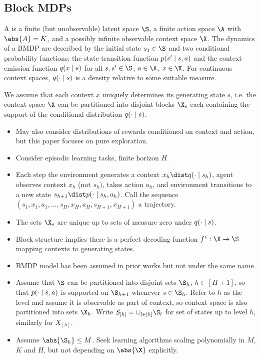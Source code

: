 \documentclass[11pt, openany]{book}
\begin{document}
\subsection{Block MDPs}
\begin{definition}
    A  is a finite (but unobservable) latent space $\S$, a finite action space $\A$ with $\abs{A}=K$, and a possibly infinite observable context space $\X$. The dynamics of a BMDP are described by the initial state $s_1\in\S$ and two conditional probability functions: the state-transition function $p(s'\mid s,a)$ and the context-emission function $q(x\mid s)$ for all $s,s'\in\S$, $a\in\A$, $x\in\X$. For continuous context spaces, $q(\cdot\mid s)$ is a density relative to some suitable measure.

    We assume that each context $x$ uniquely determines its generating state $s$, i.e. the context space $\X$ can be partitioned into disjoint blocks $\X_s$ each containing the support of the conditional distribution $q(\cdot\mid s)$.
\end{definition}

\begin{itemize}
    \item May also consider distributions of rewards conditioned on context and action, but this paper focuses on pure exploration.
    \item Consider episodic learning tasks, finite horizon $H$.
    \item Each step the environment generates a context $x_h\dist q(\cdot\given s_h)$, agent observes context $x_h$ (not $s_h)$, takes action $a_h$, and environment transitions to a new state $s_{h+1}\dist p(\cdot\given s_h,a_h)$. Call the sequence $(s_1,x_1,a_1,\dots,s_H,x_H,a_H,s_{H+1},x_{H+1})$ a trajectory.
    \item The sets $\X_s$ are unique up to sets of measure zero under $q(\cdot\mid s)$.
    \item Block structure implies there is a perfect decoding function $f^*:\X\to\S$ mapping contexts to generating states.
    \item BMDP model has been assumed in prior works but not under the same name.
    \item Assume that $\S$ can be partitioned into disjoint sets $\S_h$, $h\in[H+1]$, so that $p(\cdot\mid s,a)$ is supported on $\S_{h+1}$ whenever $s\in\S_h$. Refer to $h$ as the level and assume it is observable as part of context, so context space is also partitioned into sets $\X_h$. Write $S_{[h]} = \cup_{l\in[h]}\S_l$ for set of states up to level $h$, similarly for $X_{[h]}$.
    \item Assume $\abs{\S_h}\leq M$. Seek learning algorithms scaling polynomially in $M$, $K$ and $H$, but not depending on $\abs{\X}$ explicitly.
\end{itemize}
\end{document}
